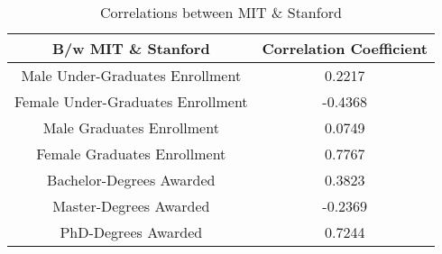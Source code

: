 \documentclass[runningheads,a4paper]{llncs}
\begin{document}
\begin{table}
\caption{Correlations between MIT \& Stanford} \begin{center}{
\label{table:table2}
{
\begin{tabular}{|c|c|}
  \hline
\textbf{B/w MIT \& Stanford}& \textbf{Correlation Coefficient} \\ \hline
 	Male Under-Graduates Enrollment & 0.2217  \\ \hline
	Female Under-Graduates Enrollment & -0.4368  \\ \hline
    Male Graduates Enrollment &	0.0749 \\ \hline
    Female Graduates Enrollment & 0.7767 \\ \hline
    Bachelor-Degrees Awarded & 0.3823 \\ \hline
    Master-Degrees Awarded & -0.2369 \\ \hline
    PhD-Degrees Awarded & 0.7244 \\ \hline
\end{tabular}
}
}
\end{center}
\end{table}
%
\end{document}
